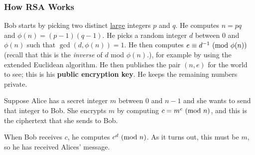 \documentclass[letterpaper]{article}
\begin{document}
\subsubsection{How RSA Works}
Bob starts by picking two distinct \underline{large} integers $p$ and $q$. He computes $n = pq$ and $\phi(n) = (p - 1)(q - 1)$. He picks a random integer $d$ between 0 and $\phi(n)$ such that $\gcd(d, \phi(n)) = 1$. He then computes $e \equiv d^{-1} \ (\mathrm{mod}\ \phi(n))$ (recall that this is the \emph{inverse} of $d$ mod $\phi(n)$.), for example by using the extended Euclidean algorithm. He then publishes the pair $(n, e)$ for the world to see; this is his \textbf{public encryption key}. He keeps the remaining numbers private.

\bigskip 

Suppose Alice has a secret integer $m$ between 0 and $n - 1$ and she wants to send that integer to Bob. She encrypts $m$ by computing $c = m^e \ (\mathrm{mod}\ n)$, and this is the ciphertext that she sends to Bob. 

\bigskip 

When Bob receives $c$, he computes $c^d \ (\mathrm{mod}\ n)$. As it turns out, this must be $m$, so he has received Alices' message. 
\end{document}

